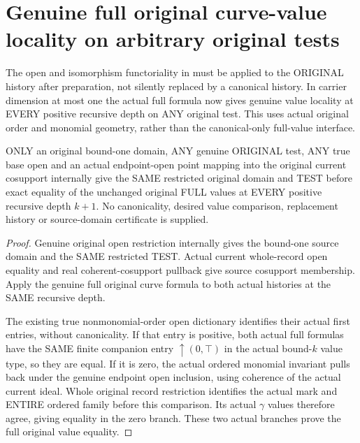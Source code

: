 \section{Genuine full original curve-value locality on arbitrary original tests}

The open and isomorphism functoriality in
\cite[Theorem~1.3 and Section~5]{bierstone-milman08-functoriality} must be
applied to the ORIGINAL history after preparation, not silently replaced
by a canonical history. In carrier dimension at most one the actual full
formula now gives genuine value locality at EVERY positive recursive
depth on ANY original test. This uses actual original order and monomial
geometry, rather than the canonical-only full-value interface.

\begin{theorem}
\label{hir:original-any-test-curve-full-value-open-naturality}
\leanok
ONLY an original bound-one domain, ANY genuine ORIGINAL test, ANY true
base open and an actual endpoint-open point mapping into the original
current cosupport internally give the SAME restricted original domain
and TEST before exact equality of the unchanged original FULL values
at EVERY positive recursive depth $k+1$. No canonicality, desired value
comparison, replacement history or source-domain certificate is supplied.
\end{theorem}
\begin{proof}
Genuine original open restriction internally gives the bound-one source
domain and the SAME restricted TEST. Actual current whole-record open
equality and real coherent-cosupport pullback give source cosupport
membership. Apply the genuine full original curve formula to both actual
histories at the SAME recursive depth.

The existing true nonmonomial-order open dictionary identifies their
actual first entries, without canonicality. If that entry is positive,
both actual full formulas have the SAME finite companion entry
$\uparrow(0,\top)$ in the actual bound-$k$ value type, so they are equal.
If it is zero, the actual ordered monomial invariant pulls back under
the genuine endpoint open inclusion, using coherence of the actual
current ideal. Whole original record restriction identifies the actual
mark and ENTIRE ordered family before this comparison. Its actual
$\gamma$ values therefore agree, giving equality in the zero branch.
These two actual branches prove the full original value equality.
\end{proof}

